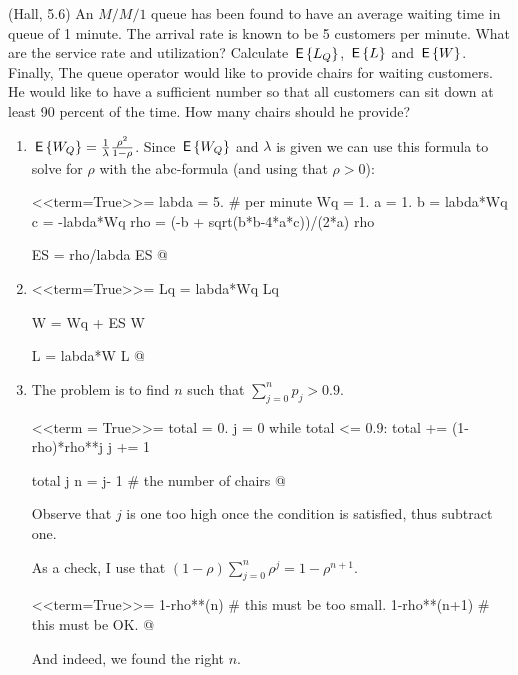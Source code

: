 \begin{exercise}(Hall, 5.6)
  An $M/M/1$ queue has been found to have an average waiting time in queue of 1 minute. The arrival rate is known to be 5 customers per minute.
 What are the service rate and utilization? Calculate $\,\mathsf{E}\left\{L_Q\right\}$,  $\,\mathsf{E}\left\{L\right\}$ and $\,\mathsf{E}\left\{W\right\}$. Finally, 
 The queue operator would like to provide chairs for waiting customers. He would like to have a sufficient number so that all customers can sit down at least 90 percent of the time. How many chairs should he provide?
    \begin{solution}
      \begin{enumerate}
      \item $\,\mathsf{E}\left\{W_Q\right\} = \frac{1}{\lambda}\frac{\rho^2}{1-\rho}$. Since
        $\,\mathsf{E}\left\{W_Q\right\}$ and $\lambda$ is given we can use this formula to
        solve for $\rho$ with the abc-formula (and using that
        $\rho > 0$):

<<term=True>>=
labda = 5. # per minute
Wq = 1.
a = 1.
b = labda*Wq
c = -labda*Wq
rho = (-b + sqrt(b*b-4*a*c))/(2*a)
rho 

ES = rho/labda
ES
@ 

\item 

<<term=True>>=
Lq = labda*Wq
Lq

W = Wq + ES
W

L = labda*W
L
@ 

\item 

The problem is to find $n$ such that
      $\sum_{j=0}^n p_j > 0.9$.

<<term = True>>=
total = 0. 
j = 0
while total <= 0.9:
   total += (1-rho)*rho**j
   j += 1

total
j
n = j- 1 # the number of chairs 
@ 

Observe that $j$ is one too high once the condition is satisfied, thus subtract one.

As a check, I use that $(1-\rho) \sum_{j=0}^n \rho^j = 1-\rho^{n+1}$.

<<term=True>>=
1-rho**(n) #  this must be too small.
1-rho**(n+1) # this must be OK.
@ 

And indeed, we found the right $n$.

  \end{enumerate}
    \end{solution}
\end{exercise}

